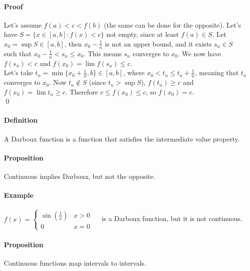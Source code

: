\documentclass{article}
\newcommand{\intcc}[1]{\left[#1\right]}
\newcommand{\Def}{\paragraph{Definition}}
\newcommand{\Proposition}{\paragraph{Proposition}}
\newcommand{\Proof}{\paragraph{Proof}}
\newcommand{\Example}{\paragraph{Example}}
\begin{document}
  \Proof Let's assume $f(a) < c < f(b)$ (the same can be done for the opposite).
  Let's have $S = \{ x \in \intcc{a,b} : f(x) < c \}$ not empty, since at least
  $f(a) \in S$. Let $x_0 = \sup S \in \intcc{a,b}$, then $x_0 - \frac{1}{n}$ is
  not an upper bound, and it exists $s_n \in S$ such that $x_0 - \frac{1}{n} <
  s_n \leq x_0$. This means $s_n$ converges to $x_0$. We now have $f(s_n) < c$
  and $f(x_0) = \lim f(s_n) \leq c$.
\\Let's take $t_n = \min \{ x_0 + \frac{1}{n}, b \} \in \intcc{a,b}$, where
  $x_0 < t_n \leq t_n + \frac{1}{n}$, meaning that $t_n$ converges to $x_0$. Now
  $t_n \notin S$ (since $t_n > \sup S$), $f(t_n) \geq c$ and $f(x_0) = \lim t_n
  \geq c$. Therefore $c \leq f(x_0) \leq c$, so $f(x_0) = c$.
\\\qed

  \Def A Darboux function is a function that satisfies the intermediate value
  property.

  \Proposition Continuous implies Darboux, but not the opposite.


  \Example $f(x) = \begin{cases}\sin(\frac{1}{x}) & x > 0 \\ 0 & x = 0\end{cases}
  \quad$ is a Darboux function, but it is not continuous.

  \Proposition Continuous functions map intervals to intervals.

\end{document}
